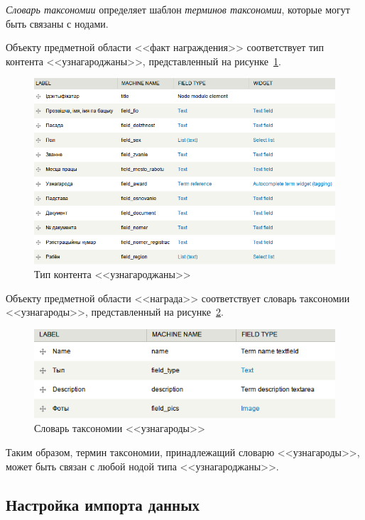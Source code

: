 \textit{Словарь таксономии} определяет шаблон \textit{терминов таксономии}, которые
могут быть связаны с нодами.

Объекту предметной области <<факт награждения>> соответствует тип контента <<узнагароджаны>>,
представленный на рисунке~\ref{fig:awarded_content_type}.

\begin{figure}[h]
  \centering
  \includegraphics[width=160mm]{pic/awarded_content_type.png}
  \caption{Тип контента <<узнагароджаны>>}
  \label{fig:awarded_content_type}
\end{figure}

Объекту предметной области <<награда>> соответствует словарь таксономии <<узнагароды>>,
представленный на рисунке~\ref{fig:awards_taxonomy}.

\begin{figure}[h]
  \centering
  \includegraphics[width=150mm]{pic/awards_taxonomy.png}
  \caption{Словарь таксономии <<узнагароды>>}
  \label{fig:awards_taxonomy}
\end{figure}

Таким образом, термин таксономии, принадлежащий словарю <<узнагароды>>, может
быть связан с любой нодой типа <<узнагароджаны>>.

\subsection{Настройка импорта данных}
\label{ssec:import_setup}

